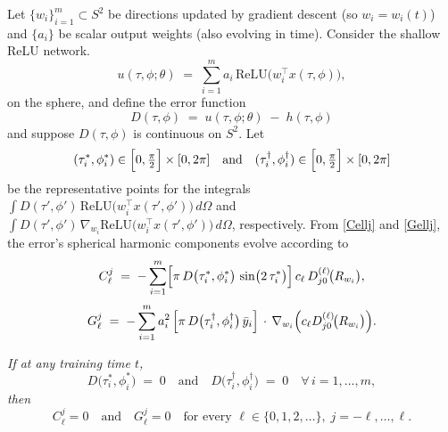 \documentclass[review,onefignum,onetabnum,onealgnum]{siamart250106}
\numberwithin{theorem}{section}
\begin{document}
\begin{corollary}
\label{thm:fp-fails-trainedweights}
Let $\{w_i\}_{i=1}^m\subset S^2$ be directions updated by gradient descent (so $w_i=w_i(t)$) and $\{a_i\}$ be scalar output weights (also evolving in time).  Consider the shallow ReLU network.
\[
u(\tau,\phi;\theta)\;=\;\sum_{i=1}^m a_i\,\mathrm{ReLU}\!\bigl(w_i^\top x(\tau,\phi)\bigr),
\]
on the sphere, and define the error function
\[
D(\tau,\phi)\;=\;u(\tau,\phi;\theta)\;-\;h(\tau,\phi)
\]
 and suppose $D(\tau,\phi)$ is continuous on $S^2$.  Let
\[
(\tau_i^*,\phi_i^*)\in \Bigl[0,\tfrac{\pi}{2}\Bigr]\times[0,2\pi]
\quad\text{and}\quad
(\tau_i^\dagger,\phi_i^\dagger)\in \Bigl[0,\tfrac{\pi}{2}\Bigr]\times[0,2\pi]
\]
be the representative points for the integrals 
\(\int D(\tau',\phi')\,\mathrm{ReLU}\!\bigl(w_i^\top x(\tau',\phi')\bigr)\,d\Omega\)
and 
\(\int D(\tau',\phi')\,\nabla_{w_i}\mathrm{ReLU}\!\bigl(w_i^\top x(\tau',\phi')\bigr)\,d\Omega\),
respectively.   From \eqref{Cellj} and \eqref{Gellj}, the error’s spherical harmonic components evolve according to
\[
C_{\ell}^j
\;=\;
-\sum_{i=1}^m 
\Bigl[
  \pi\,D\bigl(\tau_i^*,\phi_i^*\bigr)\,\sin\bigl(2\,\tau_i^*\bigr)
\Bigr]\,
c_{\ell}\,
D_{j0}^{(\ell)}\!\bigl(R_{w_i}\bigr),
\]\[
G_{\ell}^j
\;=\;
-\sum_{i=1}^m 
a_i^2\,\Bigl[\pi\,D\bigl(\tau_i^\dagger,\phi_i^\dagger\bigr)\,\bar{y}_i\Bigr]
\,\cdot\,
\nabla_{w_i}\Bigl(
  c_{\ell} D_{j0}^{(\ell)}\!\bigl(R_{w_i}\bigr)
\Bigr).
\]

\noindent
\emph{If at any training time $t$,} 
\[
D\bigl(\tau_i^*,\phi_i^*\bigr)\;=\;0
\quad\text{and}\quad
D\bigl(\tau_i^\dagger,\phi_i^\dagger\bigr)\;=\;0
\quad
\forall\,i=1,\dots,m,
\]
\emph{then}
\[
C_{\ell}^j=0
\quad
\text{and}
\quad
G_{\ell}^j=0
\quad
\text{for every }\ell\in\{0,1,2,\dots\},\; j=-\ell,\dots,\ell.
\]
\end{corollary}

\end{document}
